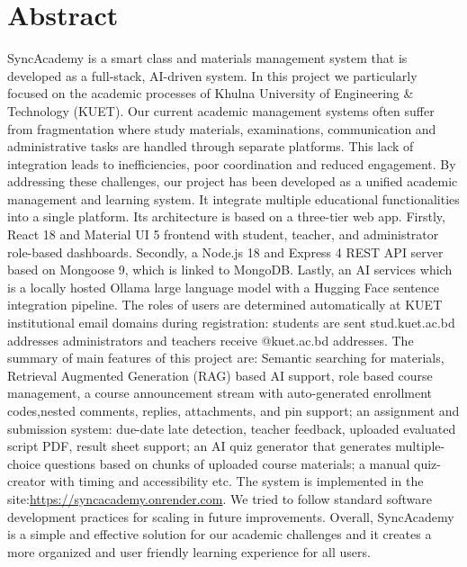 \documentclass[12pt,a4paper]{report}
\begin{document}
\chapter*{Abstract}
\thispagestyle{plain}
\vspace{2\baselineskip}
SyncAcademy is a smart class and materials management system that is developed as a full-stack, AI-driven system. In this project we  particularly focused on the academic processes of Khulna University of Engineering \& Technology (KUET). Our current academic management systems often suffer from fragmentation where study materials, examinations, communication and administrative tasks are handled through separate platforms. This lack of integration leads to inefficiencies, poor coordination and reduced engagement. By addressing these challenges, our project  has been developed as a unified academic management and learning system. It integrate multiple educational functionalities into a single platform. Its architecture is based on a three-tier web app. Firstly, React 18 and Material UI 5 frontend with student, teacher, and administrator role-based dashboards. Secondly,  a Node.js 18 and Express 4 REST API server based on Mongoose 9, which is linked to MongoDB. Lastly, an AI services which is a locally hosted Ollama large language model with a Hugging Face sentence integration pipeline. The roles of users are determined automatically at KUET institutional email domains during registration: students are sent stud.kuet.ac.bd addresses administrators and teachers receive @kuet.ac.bd addresses. The summary of main features of this project are: Semantic searching for materials, Retrieval Augmented Generation (RAG) based AI support, role based course management, a course announcement stream with auto-generated enrollment codes,nested comments, replies, attachments, and pin support; an assignment and submission system: due-date late detection, teacher feedback, uploaded evaluated script PDF, result sheet support; an AI quiz generator that generates multiple-choice questions based on chunks of uploaded course materials; a manual quiz-creator with timing and accessibility etc. The system is implemented in the site:\url{https://syncacademy.onrender.com}. We tried to follow standard software development practices for scaling  in future improvements. Overall, SyncAcademy is a simple and effective solution for our academic challenges and it creates a more organized and user friendly learning experience for all users.

\newpage
\end{document}
